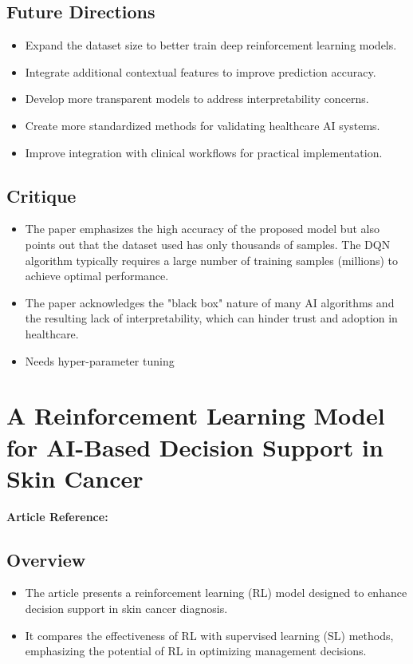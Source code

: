 \subsection*{Future Directions}
\begin{itemize}
    \item Expand the dataset size to better train deep reinforcement learning models.
    \item Integrate additional contextual features to improve prediction accuracy.
    \item Develop more transparent models to address interpretability concerns.
    \item Create more standardized methods for validating healthcare AI systems.
    \item Improve integration with clinical workflows for practical implementation.
\end{itemize}

\subsection*{Critique}
\begin{itemize}
    \item The paper emphasizes the high accuracy of the proposed model but also points out that the dataset used has only thousands of samples. The DQN algorithm typically requires a large number of training samples (millions) to achieve optimal performance.
    \item The paper acknowledges the "black box" nature of many AI algorithms and the resulting lack of interpretability, which can hinder trust and adoption in healthcare.
    \item Needs hyper-parameter tuning
\end{itemize}
\section{A Reinforcement Learning Model for AI-Based Decision Support in Skin Cancer}
\textbf{Article Reference:} \cite{barataReinforcementLearningModel2023}

\subsection*{Overview}
\begin{itemize}
    \item The article presents a reinforcement learning (RL) model designed to enhance decision support in skin cancer diagnosis.
    \item It compares the effectiveness of RL with supervised learning (SL) methods, emphasizing the potential of RL in optimizing management decisions.
\end{itemize}

